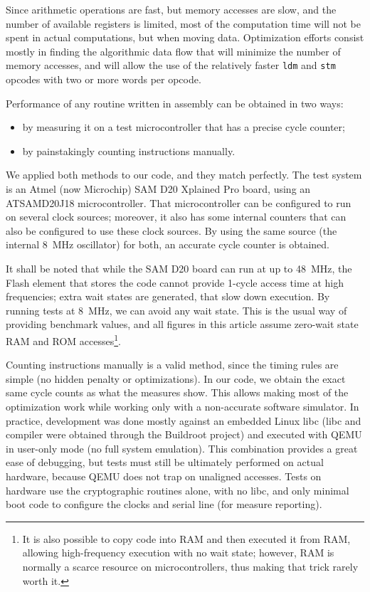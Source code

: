 \documentclass{llncs}
\begin{document}
Since arithmetic operations are fast, but memory accesses are slow, and
the number of available registers is limited, most of the computation
time will not be spent in actual computations, but when moving data.
Optimization efforts consist mostly in finding the algorithmic data flow
that will minimize the number of memory accesses, and will allow the use
of the relatively faster \verb+ldm+ and \verb+stm+ opcodes with two or
more words per opcode.

Performance of any routine written in assembly can be obtained in two
ways:
\begin{itemize}
    \item by measuring it on a test microcontroller that has a precise
    cycle counter;
    \item by painstakingly counting instructions manually.
\end{itemize}
We applied both methods to our code, and they match perfectly. The test
system is an Atmel (now Microchip) SAM D20 Xplained Pro board, using an
ATSAMD20J18 micro\-con\-trol\-ler\cite{SAMD20}. That microcontroller can
be configured to run on several clock sources; moreover, it also has
some internal counters that can also be configured to use these clock
sources. By using the same source (the internal 8~MHz oscillator) for
both, an accurate cycle counter is obtained.

It shall be noted that while the SAM D20 board can run at up to 48~MHz,
the Flash element that stores the code cannot provide 1-cycle access
time at high frequencies; extra wait states are generated, that slow
down execution. By running tests at 8~MHz, we can avoid any wait state.
This is the usual way of providing benchmark values, and all figures in
this article assume zero-wait state RAM and ROM accesses\footnote{It is
also possible to copy code into RAM and then executed it from RAM,
allowing high-frequency execution with no wait state; however, RAM is
normally a scarce resource on microcontrollers, thus making that trick
rarely worth it.}.

Counting instructions manually is a valid method, since the timing rules
are simple (no hidden penalty or optimizations). In our code, we obtain
the exact same cycle counts as what the measures show. This allows
making most of the optimization work while working only with a
non-accurate software simulator. In practice, development was done
mostly against an embedded Linux libc (libc and compiler were obtained
through the Buildroot project\cite{Buildroot}) and executed with
QEMU\cite{QEMU} in user-only mode (no full system emulation). This
combination provides a great ease of debugging, but tests must still be
ultimately performed on actual hardware, because QEMU does not trap on
unaligned accesses. Tests on hardware use the cryptographic routines
alone, with no libc, and only minimal boot code to configure the clocks
and serial line (for measure reporting).
\end{document}
